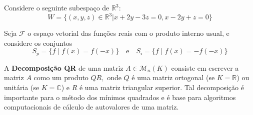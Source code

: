 \documentclass[11pt,a4paper]{article}
\begin{document}
\begin{exercicio}
Considere o seguinte subespaço de $\mathbb{R}^3:$
\[
W = \{ (x,y,z) \in \mathbb{R}^3 |x + 2y - 3z = 0, x - 2y + z = 0 \}
\]
\end{exercicio}
\solucao{}

\begin{exercicio} Seja $\mathcal{F}$ o espaço vetorial das funções reais com o produto interno usual, e considere os conjuntos
\[
S_p = \{ f \mid f(x) = f(-x) \} \quad \mbox{e} \quad S_i = \{ f \mid f(x) = -f(-x) \}
\]
\end{exercicio}
\solucao{}

\begin{exercicio}[Decomposição QR]
A \textbf{Decomposição QR} de uma matriz $A \in \mathcal{M}_n(K)$ consiste em escrever a matriz $A$ como um produto $QR,$ onde $Q$ é uma matriz ortogonal (se $K = \mathbb{R}$) ou unitária (se $K = \mathbb{C}$) e $R$ é uma matriz triangular superior. Tal decomposição é importante para o método dos mínimos quadrados e é base para algoritmos computacionais de cálculo de autovalores de uma matriz. 
\end{exercicio}
\solucao{}
\end{document}
